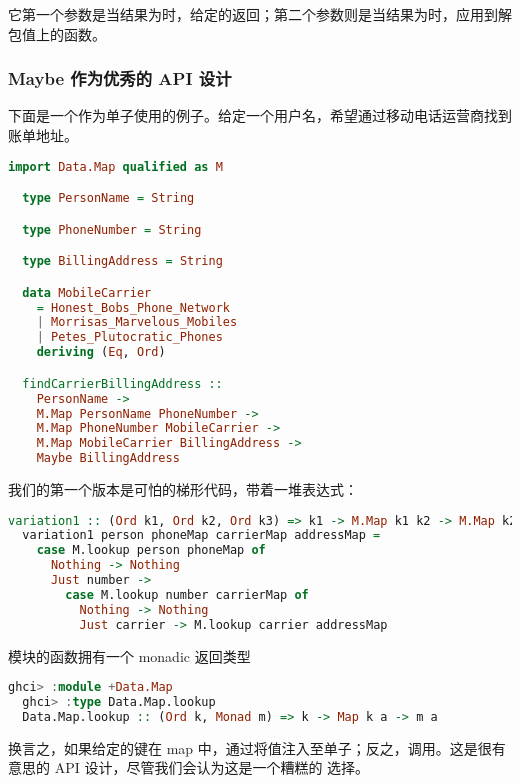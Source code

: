 \documentclass[./main.tex]{subfiles}
\begin{document}
它第一个参数是当结果为时，给定的返回；第二个参数则是当结果为时，应用到解包值上的函数。

\subsubsection*{Maybe 作为优秀的 API 设计}

下面是一个作为单子使用的例子。给定一个用户名，希望通过移动电话运营商找到账单地址。

\begin{lstlisting}[language=Haskell]
  import Data.Map qualified as M

  type PersonName = String

  type PhoneNumber = String

  type BillingAddress = String

  data MobileCarrier
    = Honest_Bobs_Phone_Network
    | Morrisas_Marvelous_Mobiles
    | Petes_Plutocratic_Phones
    deriving (Eq, Ord)

  findCarrierBillingAddress ::
    PersonName ->
    M.Map PersonName PhoneNumber ->
    M.Map PhoneNumber MobileCarrier ->
    M.Map MobileCarrier BillingAddress ->
    Maybe BillingAddress
\end{lstlisting}

我们的第一个版本是可怕的梯形代码，带着一堆表达式：

\begin{lstlisting}[language=Haskell]
  variation1 :: (Ord k1, Ord k2, Ord k3) => k1 -> M.Map k1 k2 -> M.Map k2 k3 -> M.Map k3 a -> Maybe a
  variation1 person phoneMap carrierMap addressMap =
    case M.lookup person phoneMap of
      Nothing -> Nothing
      Just number ->
        case M.lookup number carrierMap of
          Nothing -> Nothing
          Just carrier -> M.lookup carrier addressMap
\end{lstlisting}

模块的函数拥有一个 monadic 返回类型

\begin{lstlisting}[language=Haskell]
  ghci> :module +Data.Map
  ghci> :type Data.Map.lookup
  Data.Map.lookup :: (Ord k, Monad m) => k -> Map k a -> m a
\end{lstlisting}

换言之，如果给定的键在 map 中，通过将值注入至单子；反之，调用。这是很有意思的 API 设计，尽管我们会认为这是一个糟糕的
选择。
\end{document}
